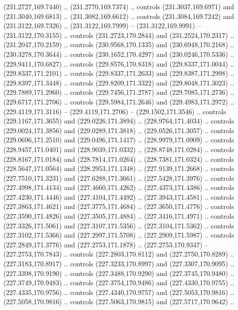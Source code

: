 \begin{scope}[cm={{1.25,0.0,0.0,-1.25,(0.0,442.91375)}}]
    (231.2727,169.7440) .. (231.2770,169.7374) .. controls (231.3037,169.6971) and
    (231.3040,169.6813) .. (231.3082,169.6612) .. controls (231.3084,169.7242) and
    (231.3122,169.7326) .. (231.3122,169.7999) -- (231.3122,169.9991) --
    (231.3122,170.3155) .. controls (231.2723,170.2844) and (231.2524,170.2317) ..
    (231.2047,170.2159) .. controls (230.9568,170.1335) and (230.6948,170.2168) ..
    (230.3278,170.3644) .. controls (230.1652,170.4297) and (230.0246,170.5336) ..
    (229.9411,170.6827) .. controls (229.8576,170.8318) and (229.8337,171.0044) ..
    (229.8337,171.2101) .. controls (229.8337,171.2633) and (229.8387,171.2998) ..
    (229.8397,171.3448) .. controls (229.8209,171.3322) and (229.8048,171.3023) ..
    (229.7889,171.2960) .. controls (229.7456,171.2787) and (229.7085,171.2736) ..
    (229.6717,171.2706) .. controls (229.5984,171.2646) and (229.4983,171.2972) ..
    (229.4119,171.3116) -- (229.4119,171.2706) -- (229.1502,171.3546) .. controls
    (229.1167,171.3655) and (229.0226,171.3894) .. (228.9764,171.4034) .. controls
    (229.0024,171.3856) and (229.0289,171.3818) .. (229.0526,171.3057) .. controls
    (229.0696,171.2510) and (229.0496,171.1417) .. (228.9979,171.0909) .. controls
    (228.9457,171.0401) and (228.9039,171.0332) .. (228.8748,171.0284) .. controls
    (228.8167,171.0184) and (228.7814,171.0264) .. (228.7381,171.0324) .. controls
    (228.5647,171.0564) and (228.2953,171.1348) .. (227.9139,171.2668) .. controls
    (227.7510,171.3231) and (227.6288,171.3661) .. (227.5428,171.3976) .. controls
    (227.4998,171.4134) and (227.4660,171.4262) .. (227.4373,171.4386) .. controls
    (227.4230,171.4446) and (227.4104,171.4492) .. (227.3943,171.4581) .. controls
    (227.3863,171.4621) and (227.3775,171.4684) .. (227.3650,171.4776) .. controls
    (227.3590,171.4826) and (227.3505,171.4884) .. (227.3416,171.4971) .. controls
    (227.3326,171.5061) and (227.3107,171.5356) .. (227.3104,171.5362) .. controls
    (227.3102,171.5366) and (227.2997,171.5708) .. (227.2909,171.5987) .. controls
    (227.2849,171.3776) and (227.2753,171.1878) .. (227.2753,170.9347) --
    (227.2753,170.7843) .. controls (227.2803,170.8112) and (227.2750,170.8289) ..
    (227.3183,170.8917) .. controls (227.3233,170.8997) and (227.3307,170.9095) ..
    (227.3398,170.9190) .. controls (227.3488,170.9290) and (227.3745,170.9480) ..
    (227.3749,170.9483) .. controls (227.3754,170.9486) and (227.4330,170.9755) ..
    (227.4335,170.9756) .. controls (227.4340,170.9757) and (227.5053,170.9816) ..
    (227.5058,170.9816) .. controls (227.5063,170.9815) and (227.5717,170.9642) ..

\end{scope}
